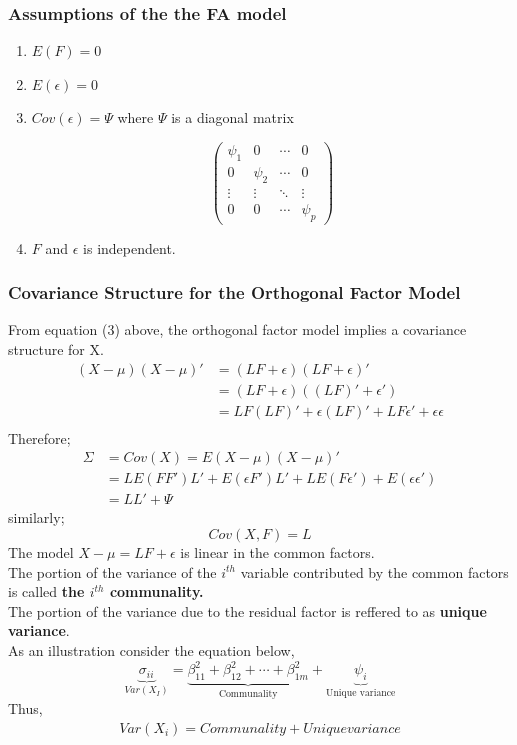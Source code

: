 \documentclass[12]{article}
\begin{document}
\subsubsection*{Assumptions of the the FA model}
\begin{enumerate}[label=\roman*]
\item $E(F) = 0$
\item $E(\epsilon) = 0$
\item $Cov(\epsilon)= \Psi $ where $\Psi$ is a diagonal matrix

 $$\begin{pmatrix}
	\psi_{1} & 0 & \cdots & 0 \\
	0 & \psi_{2} & \cdots & 0 \\
	\vdots & \vdots & \ddots & \vdots \\
	0 & 0 & \cdots & \psi_{p}
\end{pmatrix}$$
\item $F$ and $\epsilon$ is independent.
\end{enumerate}
\subsubsection{Covariance Structure for the Orthogonal Factor Model}
From equation (3) above, the orthogonal factor model implies a covariance structure for X.
\begin{align*}
	(X-\mu)(X-\mu)' &= (LF+\epsilon)(LF+\epsilon)' \\
	&= (LF+\epsilon)((LF)'+\epsilon') \\
	&= LF(LF)' + \epsilon(LF)' + LF\epsilon' + \epsilon\epsilon \\
\end{align*}
Therefore;\\
\begin{align*}
	\Sigma & = Cov(X) = E(X-\mu)(X-\mu)' \\
	&=LE(FF')L' + E(\epsilon F')L' + LE(F\epsilon')+E(\epsilon\epsilon')\\
	&= LL' + \Psi
\end{align*}
similarly;
$$Cov(X,F)= L$$
The model $X-\mu=LF+ \epsilon$ is linear in the common factors.\\
The portion of the variance of the $i^{th}$ variable contributed by the common factors is called \textbf{the $i^{th}$ communality.}\\
The portion of the variance due to the residual factor is reffered to as \textbf{unique variance}.\\
As an illustration consider the equation below,
\begin{equation*}
	\underbrace{\sigma_{ii}}_{Var(X_I)}= \underbrace{\beta_{11}^2 + \beta_{12}^2 + \cdots +\beta_{1m}^2}_\text{Communality} +\underbrace{\psi_i}_\text{Unique variance}
\end{equation*}
Thus,
\begin{align*}
	Var(X_i)= Communality + Unique variance
\end{align*}
\end{document}
